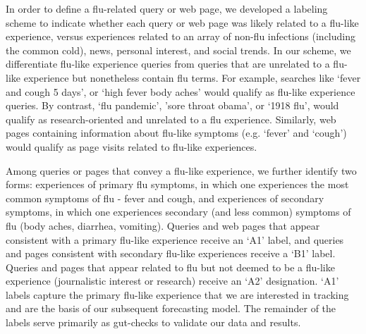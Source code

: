 \documentclass[12pt]{article}
\begin{document}
In order to define a flu-related query or web page, we developed a labeling scheme to indicate whether each query or web page was likely related to a flu-like experience, versus experiences related to an array of non-flu infections (including the common cold), news, personal interest, and social trends. In our scheme, we differentiate flu-like experience queries from queries that are unrelated to a flu-like experience but nonetheless contain flu terms. For example, searches like `fever and cough 5 days', or `high fever body aches' would qualify as flu-like experience queries. By contrast, `flu pandemic', 'sore throat obama', or `1918 flu', would qualify as research-oriented and unrelated to a flu experience. Similarly, web pages containing information about flu-like symptoms (e.g. `fever' and `cough') would qualify as page visits related to flu-like experiences.

Among queries or pages that convey a flu-like experience, we further identify two forms: experiences of primary flu symptoms, in which one experiences the most common symptoms of flu  - fever and cough, and experiences of secondary symptoms, in which one experiences secondary (and less common) symptoms of flu (body aches, diarrhea, vomiting). Queries and web pages that appear consistent with a primary flu-like experience receive an `A1' label, and queries and pages consistent with secondary flu-like experiences receive a `B1' label. Queries and pages that appear related to flu but not deemed to be a flu-like experience (journalistic interest or research) receive an `A2' designation. `A1' labels capture the primary flu-like experience that we are interested in tracking and are the basis of our subsequent forecasting model. The remainder of the labels serve primarily as gut-checks to validate our data and results.
\end{document}

